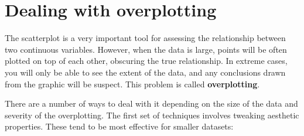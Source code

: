 \hypertarget{sec:overplotting}{%
\section{Dealing with overplotting}\label{sec:overplotting}}

The scatterplot is a very important tool for assessing the relationship
between two continuous variables. However, when the data is large,
points will be often plotted on top of each other, obscuring the true
relationship. In extreme cases, you will only be able to see the extent
of the data, and any conclusions drawn from the graphic will be suspect.
This problem is called \textbf{overplotting}. 

There are a number of ways to deal with it depending on the size of the
data and severity of the overplotting. The first set of techniques
involves tweaking aesthetic properties. These tend to be most effective
for smaller datasets:

